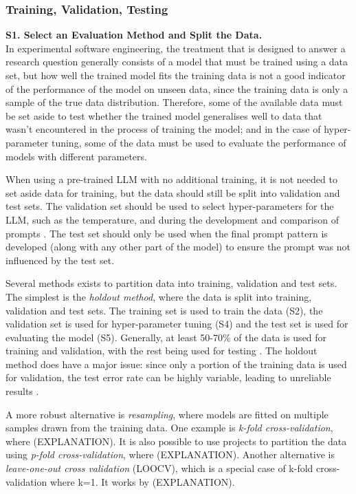 \documentclass[a4paper]{article}
\begin{document}
\subsubsection{Training, Validation, Testing}
\textbf{S1. Select an Evaluation Method and Split the Data.}\\
In experimental software engineering, the treatment that is designed to answer a research question generally consists of a model that must be trained using a data set, but how well the trained model fits the training data is not a good indicator of the performance of the model on unseen data, since the training data is only a sample of the true data distribution. Therefore, some of the available data must be set aside to test whether the trained model generalises well to data that wasn't encountered in the process of training the model; and in the case of hyper-parameter tuning, some of the data must be used to evaluate the performance of models with different parameters. 

When using a pre-trained LLM with no additional training, it is not needed to set aside data for training, but the data should still be split into validation and test sets. The validation set should be used to select hyper-parameters for the LLM, such as the temperature, and during the development and comparison of prompts \cite{Homiar2025promptdev}. The test set should only be used when the final prompt pattern is developed (along with any other part of the model) to ensure the prompt was not influenced by the test set. 

Several methods exists to partition data into training, validation and test sets. The simplest is the \textit{holdout method}, where the data is split into training, validation and test sets. The training set is used to train the data (S2), the validation set is used for hyper-parameter tuning (S4) and the test set is used for evaluating the model (S5). Generally, at least 50-70\% of the data is used for training and validation, with the rest being used for testing \cite{Bichri2024traintest,xu2018splitting}. The holdout method does have a major issue: since only a portion of the training data is used for validation, the test error rate can be highly variable, leading to unreliable results \cite{kim2009holdout,James2023isl5}. 

A more robust alternative is \textit{resampling}, where models are fitted on multiple samples drawn from the training data. One example is \textit{k-fold cross-validation}, where (EXPLANATION). It is also possible to use projects to partition the data using \textit{p-fold cross-validation}, where (EXPLANATION). Another alternative is \textit{leave-one-out cross validation} (LOOCV), which is a special case of k-fold cross-validation where k=1. It works by (EXPLANATION). 
\end{document}
